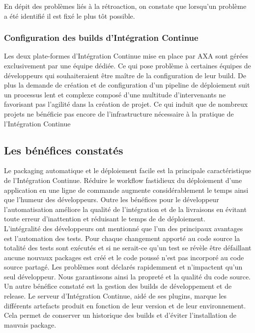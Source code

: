       En dépit des problèmes liés à la rétroaction, on constate que lorsqu'un problème a été identifié il est fixé le plus tôt possible.

      \subsubsection{Configuration des builds d'Intégration Continue}
      Les deux plate-formes d'Intégration Continue mise en place par AXA sont gérées exclusivement par une équipe dédiée. Ce qui pose problème à certaines équipes de développeurs qui souhaiteraient être maître de la configuration de leur build. De plus la demande de création et de configuration d'un pipeline de déploiement suit un processus lent et complexe composé d'une multitude d'intervenants ne favorisant pas l'agilité dans la création de projet. Ce qui induit que de nombreux projets ne bénéficie pas encore de l'infrastructure nécessaire à la pratique de l'Intégration Continue

    \subsection{Les bénéfices constatés}
    Le packaging automatique et le déploiement facile est la principale caractéristique de l'Intégration Continue. Réduire le workflow fastidieux du déploiement d'une application en une ligne de commande augmente considérablement le temps ainsi que l'humeur des développeurs. Outre les bénéfices pour le développeur l'automatisation améliore la qualité de l'intégration et de la livraisons en évitant toute erreur d'inattention et réduisant le temps de de déploiement.\\

    L'intégralité des développeurs ont mentionné que l'un des principaux avantages est l'automation des tests. Pour chaque changement apporté au code source la totalité des tests sont exécutés et si ne serait-ce qu'un test se révèle être défaillant aucune nouvaux packages est créé et le code poussé n'est pas incorporé au code source partagé. Les problèmes sont déclarés rapidemment et n'impactent qu'un seul développeur. Nous garantissons ainsi la propreté et la qualité du code source.\\

    Un autre bénéfice constaté est la gestion des builds de développement et de release. Le serveur d'Intégration Continue, aidé de ses plugins, marque les différents artefacts produit en fonction de leur version et de leur environnement. Cela permet de conserver un historique des builds et d'éviter l'installation de mauvais package.\\

